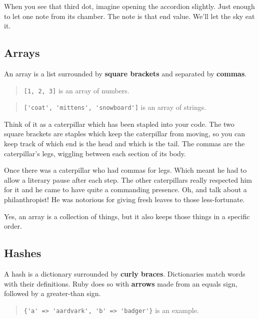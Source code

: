 \documentclass[10pt,twoside]{report}
\begin{document}
When you see that third dot, imagine opening the accordion slightly.
Just enough to let one note from its chamber.  The note is that end
value.  We'll let the sky eat it.



\subsection{Arrays}



An array is a list surrounded by {\bf square brackets} and separated
by {\bf commas}.

\begin{quote}
\lstinline[breaklines=true]|[1, 2, 3]| is an array of
numbers.\end{quote}


\begin{quote}
\lstinline[breaklines=true]|['coat', 'mittens', 'snowboard']| is an
array of strings.\end{quote}


Think of it as a caterpillar which has been stapled into your code.
The two square brackets are staples which keep the caterpillar from
moving, so you can keep track of which end is the head and which is
the tail.  The commas are the caterpillar's legs, wiggling between
each section of its body.

Once there was a caterpillar who had commas for legs.  Which meant he
had to allow a literary pause after each step.  The other caterpillars
really respected him for it and he came to have quite a commanding
presence.  Oh, and talk about a philanthropist!  He was notorious for
giving fresh leaves to those less-fortunate.

Yes, an array is a collection of things, but it also keeps those
things in a specific order.




\subsection{Hashes}



A hash is a dictionary surrounded by {\bf curly braces}.  Dictionaries
match words with their definitions.  Ruby does so with {\bf arrows}
made from an equals sign, followed by a greater-than sign.

\begin{quote}
\lstinline[breaklines=true]|{'a' => 'aardvark', 'b' => 'badger'}| is
an example.\end{quote}
\end{document}
